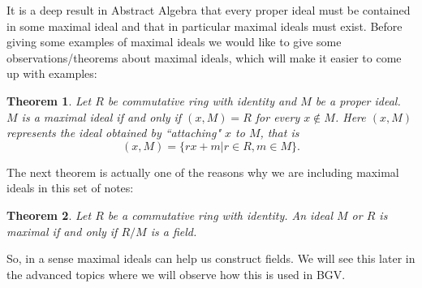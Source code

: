 \documentclass[12pt]{article}
\theoremstyle{plain}
\newtheorem{theorem}{Theorem}
\theoremstyle{definition}
\theoremstyle{remark}
\begin{document}
It is a deep result in Abstract Algebra that every proper ideal must be contained in some maximal ideal and that in particular maximal ideals must exist. Before giving some examples of maximal ideals we would like to give some observations/theorems about maximal ideals, which will make it easier to come up with examples:
\begin{theorem}
Let $R$ be commutative ring with identity and $M$ be a proper ideal. $M$ is a maximal ideal if and only if $(x,M)=R$ for every $x\not \in M$. Here $(x,M)$ represents the ideal obtained by ``attaching" $x$ to $M$, that is
$$(x,M) = \{rx+m|r\in R, m\in M\}.$$
\end{theorem}
The next theorem is actually one of the reasons why we are including maximal ideals in this set of notes:
\begin{theorem}
Let $R$ be a commutative ring with identity. An ideal $M$ or $R$ is maximal if and only if $R/M$ is a field.
\end{theorem}
So, in a sense maximal ideals can help us construct fields. We will see this later in the advanced topics where we will observe how this is used in BGV.
\end{document}
